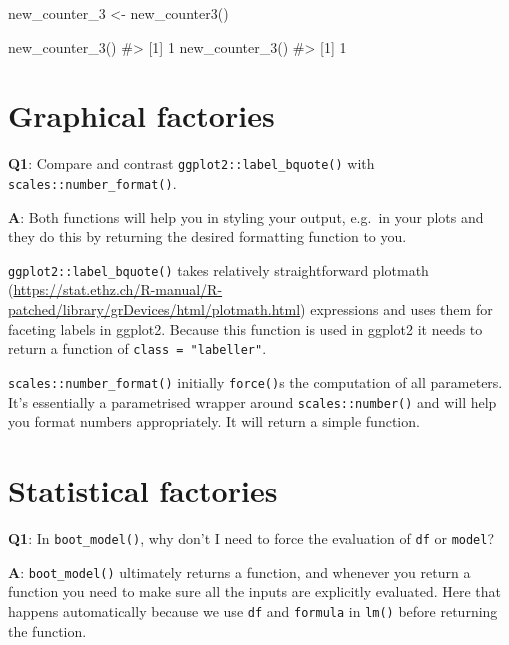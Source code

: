 \documentclass[
]{krantz}
\makeatletter
\newenvironment{Shaded}{\begin{snugshade}}{\end{snugshade}}
\newcommand{\CommentTok}[1]{\textcolor[rgb]{0.56,0.35,0.01}{\textit{#1}}}
\newcommand{\DecValTok}[1]{\textcolor[rgb]{0.00,0.00,0.81}{#1}}
\newcommand{\KeywordTok}[1]{\textcolor[rgb]{0.13,0.29,0.53}{\textbf{#1}}}
\newcommand{\NormalTok}[1]{#1}
\newcommand{\StringTok}[1]{\textcolor[rgb]{0.31,0.60,0.02}{#1}}
\renewcommand{\href}[2]{#2 (\url{#1})}
\newenvironment{kframe}{%
\medskip{}
\setlength{\fboxsep}{.8em}
 \def\at@end@of@kframe{}%
 \ifinner\ifhmode%
  \def\at@end@of@kframe{\end{minipage}}%
  \begin{minipage}{\columnwidth}%
 \fi\fi%
 \def\FrameCommand##1{\hskip\@totalleftmargin \hskip-\fboxsep
 \colorbox{shadecolor}{##1}\hskip-\fboxsep
     \hskip-\linewidth \hskip-\@totalleftmargin \hskip\columnwidth}%
 \MakeFramed {\advance\hsize-\width
   \@totalleftmargin\z@ \linewidth\hsize
   \@setminipage}}%
 {\par\unskip\endMakeFramed%
 \at@end@of@kframe}
\renewenvironment{Shaded}{\begin{kframe}}{\end{kframe}}
\renewcommand{\KeywordTok} [1]{\textcolor[rgb]{0.00,0.44,0.13}{{#1}}}
\renewcommand{\DecValTok}  [1]{\textcolor[rgb]{0.25,0.63,0.44}{{#1}}}
\renewcommand{\StringTok}  [1]{\textcolor[rgb]{0.25,0.44,0.63}{{#1}}}
\renewcommand{\CommentTok} [1]{\textcolor[rgb]{0.38,0.63,0.69}{{#1}}}
\renewcommand{\NormalTok}  [1]{{#1}}
\makeatother
\begin{document}
\begin{Shaded}
\begin{Highlighting}[]
\NormalTok{new_counter_}\DecValTok{3}\NormalTok{ <-}\StringTok{ }\KeywordTok{new_counter3}\NormalTok{()}

\KeywordTok{new_counter_3}\NormalTok{()}
\CommentTok{#> [1] 1}
\KeywordTok{new_counter_3}\NormalTok{()}
\CommentTok{#> [1] 1}
\end{Highlighting}
\end{Shaded}

\hypertarget{graphical-factories}{%
\section{Graphical factories}\label{graphical-factories}}

\textbf{{Q1}}: Compare and contrast \texttt{ggplot2::label\_bquote()} with \texttt{scales::number\_format()}.

\textbf{{A}}: Both functions will help you in styling your output, e.g.~in your plots and they do this by returning the desired formatting function to you.

\texttt{ggplot2::label\_bquote()} takes relatively straightforward \href{https://stat.ethz.ch/R-manual/R-patched/library/grDevices/html/plotmath.html}{plotmath} expressions and uses them for faceting labels in ggplot2. Because this function is used in ggplot2 it needs to return a function of \texttt{class\ =\ "labeller"}.

\texttt{scales::number\_format()} initially \texttt{force()}s the computation of all parameters. It's essentially a parametrised wrapper around \texttt{scales::number()} and will help you format numbers appropriately. It will return a simple function.

\hypertarget{statistical-factories}{%
\section{Statistical factories}\label{statistical-factories}}

\textbf{{Q1}}: In \texttt{boot\_model()}, why don't I need to force the evaluation of \texttt{df} or \texttt{model}?

\textbf{{A}}: \texttt{boot\_model()} ultimately returns a function, and whenever you return a function you need to make sure all the inputs are explicitly evaluated. Here that happens automatically because we use \texttt{df} and \texttt{formula} in \texttt{lm()} before returning the function.
\end{document}
